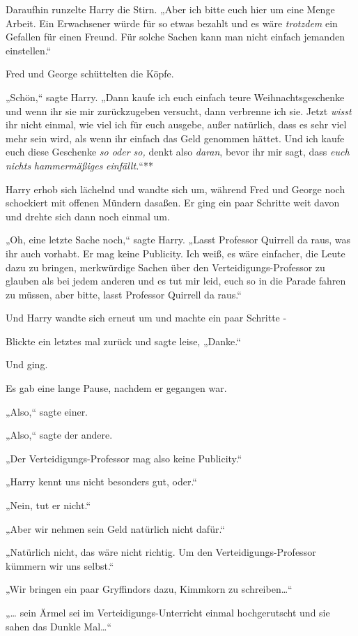 {Daraufhin runzelte Harry die Stirn. „Aber ich bitte euch hier um eine Menge Arbeit. Ein Erwachsener würde für so etwas bezahlt und es wäre \emph{trotzdem} ein Gefallen für einen Freund. Für solche Sachen kann man nicht einfach jemanden einstellen.“

Fred und George schüttelten die Köpfe.

„Schön,“ sagte Harry. „Dann kaufe ich euch einfach teure Weihnachtsgeschenke und wenn ihr sie mir zurückzugeben versucht, dann verbrenne ich sie. Jetzt \emph{wisst} ihr nicht einmal, wie viel ich für euch ausgebe, außer natürlich, dass es sehr viel mehr sein wird, als wenn ihr einfach das Geld genommen hättet. Und ich kaufe euch diese Geschenke \emph{so oder so,} denkt also \emph{daran}, bevor ihr mir sagt, dass \emph{euch nichts} \emph{hammermäßiges} \emph{einfällt.}“**

Harry erhob sich lächelnd und wandte sich um, während Fred und George noch schockiert mit offenen Mündern dasaßen. Er ging ein paar Schritte weit davon und drehte sich dann noch einmal um.

„Oh, eine letzte Sache noch,“ sagte Harry. „Lasst Professor Quirrell da raus, was ihr auch vorhabt. Er mag keine Publicity. Ich weiß, es wäre einfacher, die Leute dazu zu bringen, merkwürdige Sachen über den Verteidigungs-Professor zu glauben als bei jedem anderen und es tut mir leid, euch so in die Parade fahren zu müssen, aber bitte, lasst Professor Quirrell da raus.“

Und Harry wandte sich erneut um und machte ein paar Schritte -

Blickte ein letztes mal zurück und sagte leise, „Danke.“

Und ging.

Es gab eine lange Pause, nachdem er gegangen war.

„Also,“ sagte einer.

„Also,“ sagte der andere.

„Der Verteidigungs-Professor mag also keine Publicity.“

„Harry kennt uns nicht besonders gut, oder.“

„Nein, tut er nicht.“

„Aber wir nehmen sein Geld natürlich nicht dafür.“

„Natürlich nicht, das wäre nicht richtig. Um den Verteidigungs-Professor kümmern wir uns selbst.“

„Wir bringen ein paar Gryffindors dazu, Kimmkorn zu schreiben…“

„… sein Ärmel sei im Verteidigungs-Unterricht einmal hochgerutscht und sie sahen das Dunkle Mal…“

}
